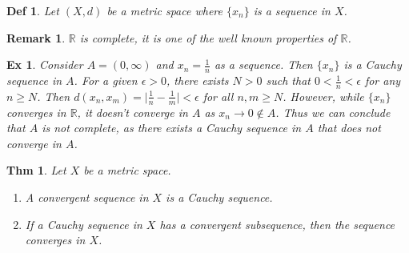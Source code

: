 \documentclass[paper=a4, fontsize=11pt]{scrartcl}
\newtheorem{theorem}{Thm}
\newtheorem{definition}{Def}
\newtheorem{example}{Ex}
\newtheorem*{remark}{Remark}
\begin{document}
\begin{definition}
Let $(X,d)$ be a metric space where $\{x_n\}$ is a sequence in $X$.
\end{definition}

\begin{remark}
	$\mathbb{R}$ is complete, it is one of the well known properties of  $\mathbb{R}$.
\end{remark}

\begin{example}
	Consider $A=(0,\infty)$ and $x_n = \frac{1}{n}$ as a sequence. Then $\{x_n\}$ is a Cauchy sequence in $A$. For a given $\epsilon >0$, there exists $N>0$ such that $0<\frac{1}{n}<\epsilon$ for any $n\geq N$. Then $d(x_n, x_m) = \big|\frac{1}{n}-\frac{1}{m}\big| < \epsilon$ for all $n,m \geq N$. However, while $\{x_n\}$ converges in $\mathbb{R}$, it doesn't converge in $A$ as $x_n \to 0 \notin A$. Thus we can conclude that $A$ is not complete, as there exists a Cauchy sequence in $A$ that does not converge in $A$.\\
\end{example}

\begin{theorem}
Let $X$ be a metric space.
\begin{enumerate}
	\item A convergent sequence in $X$ is a Cauchy sequence.
	\item If a Cauchy sequence in $X$ has a convergent subsequence, then the sequence converges in $X$.\\
\end{enumerate}	
\end{theorem}
\end{document}
